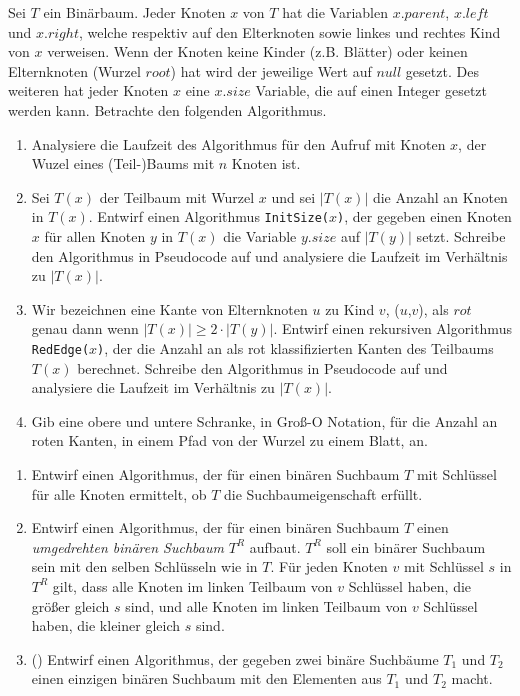 \documentclass{uebung_cs}
\begin{document}
\begin{aufgabe}
	Sei $T$ ein Binärbaum.
	Jeder Knoten $x$ von $T$ hat die Variablen $x.parent$, $x.left$ und $x.right$, welche respektiv auf den Elterknoten sowie linkes und rechtes Kind von $x$ verweisen.
	Wenn der Knoten keine Kinder (z.B. Blätter) oder keinen Elternknoten (Wurzel $root$) hat wird der jeweilige Wert auf $null$ gesetzt.
	Des weiteren hat jeder Knoten $x$ eine $x.size$ Variable, die auf einen Integer gesetzt werden kann.
	Betrachte den folgenden Algorithmus.
	\begin{algorithmic}
		\EndIf
	\end{algorithmic}
		
	\begin{enumerate}
		\item Analysiere die Laufzeit des Algorithmus für den Aufruf mit Knoten $x$, der Wuzel eines (Teil-)Baums mit $n$ Knoten ist.
		\item Sei $T(x)$ der Teilbaum mit Wurzel $x$ und sei $|T(x)|$ die Anzahl an Knoten in $T(x)$.
		Entwirf einen Algorithmus \texttt{InitSize($x$)}, der gegeben einen Knoten $x$ für allen Knoten $y$ in $T(x)$ die Variable $y.size$ auf $|T(y)|$ setzt.
		Schreibe den Algorithmus in Pseudocode auf und analysiere die Laufzeit im Verhältnis zu $|T(x)|$.
		\item Wir bezeichnen eine Kante von Elternknoten $u$ zu Kind $v$, ($u$,$v$), als $rot$ genau dann wenn $|T(x)| \geq 2\cdot|T(y)|$.
		Entwirf einen rekursiven Algorithmus \texttt{RedEdge($x$)}, der die Anzahl an als rot klassifizierten Kanten des Teilbaums $T(x)$ berechnet.
		Schreibe den Algorithmus in Pseudocode auf und analysiere die Laufzeit im Verhältnis zu $|T(x)|$.
		\item Gib eine obere und untere Schranke, in Groß-O Notation, für die Anzahl an roten Kanten, in einem Pfad von der Wurzel zu einem Blatt, an.
	\end{enumerate}
\end{aufgabe}

\begin{aufgabe}
	\begin{enumerate}
		\item Entwirf einen Algorithmus, der für einen binären Suchbaum $T$ mit Schlüssel für alle Knoten ermittelt, ob $T$ die Suchbaumeigenschaft erfüllt.
		\item Entwirf einen Algorithmus, der für einen binären Suchbaum $T$ einen \textit{umgedrehten binären Suchbaum} $T^R$ aufbaut.
		$T^R$ soll ein binärer Suchbaum sein mit den selben Schlüsseln wie in $T$.
		Für jeden Knoten $v$ mit Schlüssel $s$ in $T^R$ gilt, dass alle Knoten im linken Teilbaum von $v$ Schlüssel haben, die größer gleich $s$ sind, und alle Knoten im linken Teilbaum von $v$ Schlüssel haben, die kleiner gleich $s$ sind.
		\item (\hard) Entwirf einen Algorithmus, der gegeben zwei binäre Suchbäume $T_1$ und $T_2$ einen einzigen binären Suchbaum mit den Elementen aus $T_1$ und $T_2$ macht.
	\end{enumerate}
\end{aufgabe}
\end{document}
